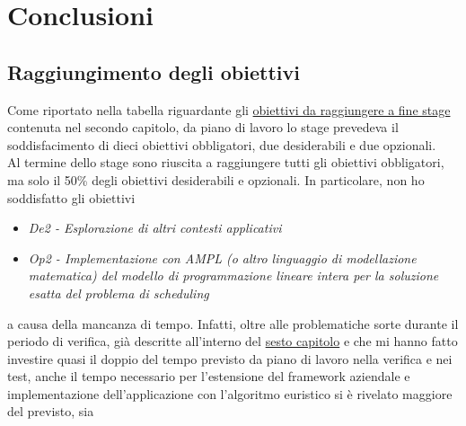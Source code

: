 
\chapter{Conclusioni}
\label{cap:conclusioni}
\section{Raggiungimento degli obiettivi}
Come riportato nella tabella riguardante gli {\hyperref[tab:obiettivi]{obiettivi da raggiungere a fine stage}} contenuta nel secondo capitolo, da piano di lavoro lo stage prevedeva il soddisfacimento di dieci obiettivi obbligatori, due desiderabili e due opzionali. \\
Al termine dello stage sono riuscita a raggiungere tutti gli obiettivi obbligatori, ma solo il 50\% degli obiettivi desiderabili e opzionali. In particolare, non ho soddisfatto gli obiettivi 
\begin{itemize}
\item \textit{De2 - Esplorazione di altri contesti applicativi} 
\item \textit{Op2 - Implementazione con AMPL (o altro linguaggio di modellazione matematica) del modello di programmazione lineare intera per la soluzione esatta del problema di scheduling}
\end{itemize}
\noindent
a causa della mancanza di tempo. Infatti, oltre alle problematiche sorte durante il periodo di verifica, già descritte all'interno del {\hyperref[cap:verifica-validazione]{sesto capitolo}} e che mi hanno fatto investire quasi il doppio del tempo previsto da piano di lavoro nella verifica e nei test, anche il tempo necessario per l'estensione del framework aziendale e implementazione dell'applicazione con l'algoritmo euristico si è rivelato maggiore del previsto, sia 
